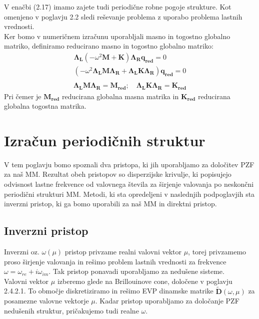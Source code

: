 \documentclass[12pt]{report}
\begin{document}
V enačbi (2.17) imamo zajete tudi periodične robne pogoje strukture. Kot omenjeno v poglavju 2.2 sledi reševanje problema z uporabo problema
lastnih vrednosti.
\\
Ker bomo v numeričnem izračunu uporabljali masno in togostno globalno matriko, definiramo reducirano masno in togostno globalno matriko:
\begin{equation*}
  \begin{aligned}
    \mathbf{\Lambda_L} (-\omega^2 \mathbf{M} + \mathbf{K})\mathbf{\Lambda_R q_{red}} = 0 \\
    (-\omega^2 \mathbf{\Lambda_L} \mathbf{M} \mathbf{\Lambda_R}  + \mathbf{\Lambda_L} \mathbf{K} \mathbf{\Lambda_R}) \mathbf{q_{red}} = 0 \\
  \end{aligned}
\end{equation*}
\begin{equation}
  \begin{aligned}
    \mathbf{\Lambda_L} \mathbf{M} \mathbf{\Lambda_R} = \mathbf{M_{red}}; \quad 
    \mathbf{\Lambda_L} \mathbf{K} \mathbf{\Lambda_R} = \mathbf{K_{red}}
  \end{aligned}
\end{equation}
\noindent Pri čemer je $\mathbf{M_{red}}$ reducirana globalna masna matrika in  $\mathbf{K_{red}}$ reducirana globalna togostna matrika.

\section{Izračun periodičnih struktur}
V tem poglavju bomo spoznali dva pristopa, ki jih uporabljamo za določitev \ac{PZF} za naš \ac{MM}. Rezultat obeh pristopov so disperzijske krivulje, ki popisujejo odvisnost lastne frekvence od valovnega števila 
za širjenje valovanja po neskončni periodični strukturi \ac{MM}. Metodi, ki sta opredeljeni v naslednjih podpoglavjih sta inverzni pristop, ki ga bomo uporabili za naš \ac{MM} in direktni pristop.

\subsection{Inverzni pristop}
Inverzni oz. $\omega(\mu)$ pristop privzame realni valovni vektor $\mu$, torej privzamemo proso širjenje valovanja in rešimo problem lastnih vrednosti za frekvence $\omega = \omega_{re} + i\omega_{im}$. Tak pristop ponavadi 
uporabljamo za nedušene sisteme. \cite{vanbelle} \\
Valovni vektor $\mu$ izberemo glede na Brillouinove cone, določene v poglavju 2.4.2.1. To območje diskretiziramo in rešimo \ac{EVP} dinamske matrike $\mathbf{\widetilde{D}}(\omega, \mu)$ za posamezne valovne vektorje $\mu$.
Kadar pristop uporabljamo za določanje \ac{PZF} nedušenih struktur, pričakujemo tudi realne $\omega$. \cite{kosir}
\end{document}
